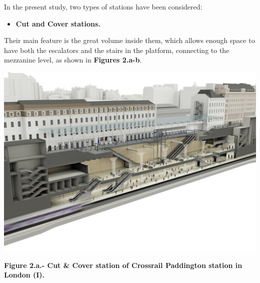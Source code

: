 \documentclass{article}
\begin{document}
\noindent{}In the present study, two types of stations have been considered:%

\begin{itemize}[noitemsep,topsep=\mdcompacttopsep]%

\item{}\textbf{Cut and Cover stations.}%
\end{itemize}%

\noindent{}Their main feature is the great volume inside them, which allows enough space to have both the escalators and the stairs 
in the platform, connecting to the mezzanine level, as shown in \textbf{Figures 2.a-b}.%

\begin{mdcenter}%

\noindent{}\includegraphics[keepaspectratio=true,width=\dimmin{}{\dimwidth{0.50}}]{images/Fig-2.a}{}%
\end{mdcenter}%

\begin{mdcenter}%

\noindent{}\textbf{Figure 2.a.- Cut \& Cover station of Crossrail Paddington station in London (I).}%
\end{mdcenter}%
\end{document}
